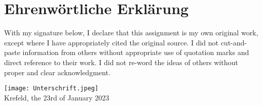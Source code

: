 \section*{Ehrenwörtliche Erklärung}
With my signature below, I declare that this assignment is my own original
work, except where I have appropriately cited the original source. I did not
cut-and-paste information from others without appropriate use of quotation
marks and direct reference to their work. I did not re-word the ideas of
others without proper and clear acknowledgment.

\noindent 

\texttt{[image: Unterschrift.jpeg]} \\
Krefeld, the 23rd of January 2023

